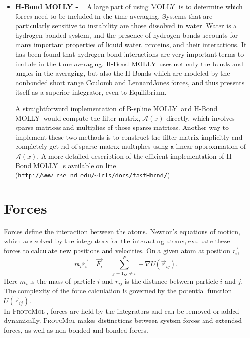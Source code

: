 \documentclass[11pt]{report}
\newcommand{\ProtoMol}{\textsc{ProtoMol }}
\newcommand{\MOLLY}{\textsc{MOLLY\ }}
\providecommand{\ttsmall}[1]{\texttt{\small\mbox{#1}}}
\begin{document}
\begin{appendix}
\begin{itemize}
\item {\bf H-Bond MOLLY - ~\cite{IzagCar00}} A large part of using
\MOLLY is to determine which forces need to be included in the time
averaging.  Systems that are particularly sensitive to instability are
those dissolved in water.  Water is a hydrogen bonded system, and the
presence of hydrogen bonds accounts for many important properties of
liquid water, proteins, and their interactions.  It has been found
that hydrogen bond interactions are very important terms to
include in the time averaging.  H-Bond \MOLLY uses not only the bonds
and angles in the averaging, but also the H-Bonds which are modeled by 
the nonbonded short range Coulomb and LennardJones forces, and thus
presents itself as a superior integrator, even to Equilibrium.

A straightforward implementation of B-spline \MOLLY and H-Bond
\MOLLY would compute the filter matrix,
$\mathcal{A}(x)$ directly, which involves sparse matrices and
multiplies of those sparse matrices. Another way to implement these
two methods is to construct the filter matrix implicitly and
completely get rid of sparse matrix multiplies using a linear
approximation of $\mathcal{A}(x)$. A more detailed description of the
efficient implementation of H-Bond \MOLLY is available on line\\
(\ttsmall{http://www.cse.nd.edu/\~{ }lcls/docs/fastHbond/}).

\end{itemize}

\section{Forces}

Forces define the interaction between the atoms. Newton's equations of
motion, which are solved by the integrators for the interacting atoms, evaluate
these forces to calculate new positions and velocities. On
a given atom at
position $\vec{r_{i}}$,
\begin{equation}
 m_{i} \vec{\ddot{r_{i}}} =  \vec{F_{i}} = \sum_{j=1,j \neq i}^{N} -\nabla
 U(\vec{r}_{ij}).
\end{equation}
   Here $m_{i}$ is the mass of particle $i$ and $r_{ij}$ is the distance
between particle $i$ and $j$. The complexity of the force calculation
is governed by the potential function $U(\vec{r}_{ij})$.
\\

In \ProtoMol, forces are held by the integrators and can be removed or added dynamically.  \ProtoMol makes distinctions between system forces and extended forces, as well as non-bonded and bonded forces.




\end{appendix}
\end{document}
